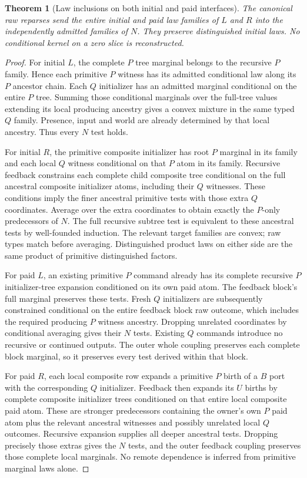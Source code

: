 \documentclass[11pt]{article}\usepackage{amsmath,amssymb,amsthm,geometry}\geometry{margin=1in}
\newtheorem{theorem}{Theorem}
\begin{document}
\begin{theorem}[Law inclusions on both initial and paid interfaces]
The canonical raw reparses send the entire initial and paid law families of $L$ and $R$ into the independently admitted families of $N$. They preserve distinguished initial laws. No conditional kernel on a zero slice is reconstructed.
\end{theorem}
\begin{proof}
For initial $L$, the complete $P$ tree marginal belongs to the recursive $P$ family. Hence each primitive $P$ witness has its admitted conditional law along its $P$ ancestor chain. Each $Q$ initializer has an admitted marginal conditional on the entire $P$ tree. Summing those conditional marginals over the full-tree values extending its local producing ancestry gives a convex mixture in the same typed $Q$ family. Presence, input and world are already determined by that local ancestry. Thus every $N$ test holds.

For initial $R$, the primitive composite initializer has root $P$ marginal in its family and each local $Q$ witness conditional on that $P$ atom in its family. Recursive feedback constrains each complete child composite tree conditional on the full ancestral composite initializer atoms, including their $Q$ witnesses. These conditions imply the finer ancestral primitive tests with those extra $Q$ coordinates. Average over the extra coordinates to obtain exactly the $P$-only predecessors of $N$. The full recursive subtree test is equivalent to these ancestral tests by well-founded induction. The relevant target families are convex; raw types match before averaging. Distinguished product laws on either side are the same product of primitive distinguished factors.

For paid $L$, an existing primitive $P$ command already has its complete recursive $P$ initializer-tree expansion conditioned on its own paid atom. The feedback block's full marginal preserves these tests. Fresh $Q$ initializers are subsequently constrained conditional on the entire feedback block raw outcome, which includes the required producing $P$ witness ancestry. Dropping unrelated coordinates by conditional averaging gives their $N$ tests. Existing $Q$ commands introduce no recursive or continued outputs. The outer whole coupling preserves each complete block marginal, so it preserves every test derived within that block.

For paid $R$, each local composite row expands a primitive $P$ birth of a $B$ port with the corresponding $Q$ initializer. Feedback then expands its $U$ births by complete composite initializer trees conditioned on that entire local composite paid atom. These are stronger predecessors containing the owner's own $P$ paid atom plus the relevant ancestral witnesses and possibly unrelated local $Q$ outcomes. Recursive expansion supplies all deeper ancestral tests. Dropping precisely those extras gives the $N$ tests, and the outer feedback coupling preserves those complete local marginals. No remote dependence is inferred from primitive marginal laws alone.


\end{proof}
\end{document}
